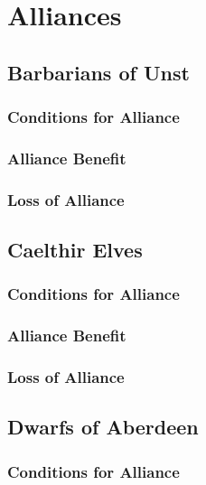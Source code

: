 \chapter*{Alliances}

\section*{Barbarians of Unst}\label{alliance:UnstBarbarian}
\subsection*{Conditions for Alliance}
\subsection*{Alliance Benefit}
\subsection*{Loss of Alliance}

\section*{Caelthir Elves}\label{alliance:CaelthirElves}
\subsection*{Conditions for Alliance}
\subsection*{Alliance Benefit}
\subsection*{Loss of Alliance}

\section*{Dwarfs of Aberdeen}\label{alliance:AberdeenDwarfs}
\subsection*{Conditions for Alliance}
